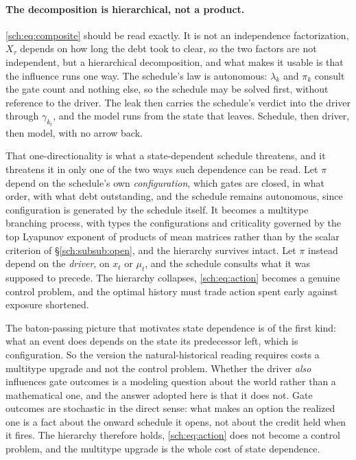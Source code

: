 \documentclass[11pt]{article}
\numberwithin{equation}{section}
\theoremstyle{plain}
\theoremstyle{definition}
\theoremstyle{remark}
\begin{document}
\paragraph{The decomposition is hierarchical, not a product.}\label{sch:rem:hierarchical}
\eqref{sch:eq:composite} should be read exactly. It is not an
independence factorization, $X_\tau$ depends on how long the debt
took to clear, so the two factors are not independent, but a
hierarchical decomposition, and what makes it usable is that the
influence runs one way. The schedule's law is autonomous: $\lambda_k$
and $\pi_k$ consult the gate count and nothing else, so the schedule may
be solved first, without reference to the driver. The leak then carries
the schedule's verdict into the driver through $\gamma_{k_t}$, and the
model runs from the state that leaves. Schedule, then driver, then
model, with no arrow back.

That one-directionality is what a state-dependent schedule threatens,
and it threatens it in only one of the two ways such dependence can be
read. Let $\pi$ depend on the schedule's own \emph{configuration}, which gates are closed, in what order, with what debt outstanding, and the schedule remains autonomous, since configuration is generated by
the schedule itself. It becomes a multitype branching process, with
types the configurations and criticality governed by the top Lyapunov
exponent of products of mean matrices rather than by the scalar
criterion of \S\ref{sch:subsub:open}, and the hierarchy survives intact.
Let $\pi$ instead depend on the \emph{driver}, on $x_t$ or $\mu_t$, and the schedule consults what it was supposed to precede. The
hierarchy collapses, \eqref{sch:eq:action} becomes a genuine control
problem, and the optimal history must trade action spent early against
exposure shortened.

The baton-passing picture that motivates state dependence is of the
first kind: what an event does depends on the state its predecessor
left, which is configuration. So the version the natural-historical
reading requires costs a multitype upgrade and not the control problem.
Whether the driver \emph{also} influences gate outcomes is a modeling
question about the world rather than a mathematical one, and the answer
adopted here is that it does not. Gate outcomes are stochastic in the
direct sense: what makes an option the realized one is a fact about the
onward schedule it opens, not about the credit held when it fires. The
hierarchy therefore holds, \eqref{sch:eq:action} does not become a
control problem, and the multitype upgrade is the whole cost of state
dependence.
\end{document}
